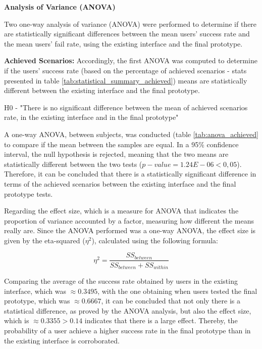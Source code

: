 \medskip

\textbf{Analysis of Variance (ANOVA)}

\medskip

Two one-way analysis of variance (ANOVA) were performed to determine if there are statistically significant differences between the mean users' success rate and the mean users' fail rate, using the existing interface and the final prototype.

\textbf{Achieved Scenarios:} Accordingly, the first ANOVA was computed to determine if the users' success rate (based on the percentage of achieved scenarios - stats presented in table \ref{tab:statistical_summary_achieved}) means are statistically different between the existing interface and the final prototype.

\begin{center}
  H0 - "There is no significant difference between the mean of achieved scenarios rate, in the existing interface and in the final prototype"
\end{center}

A one-way ANOVA, between subjects, was conducted (table \ref{tab:anova_achieved} to compare if the mean between the samples are equal. In a 95\% confidence interval, the null hypothesis is rejected, meaning that the two means are statistically different between the two tests ($p-value = 1.24E-06 < 0,05$). Therefore, it can be concluded that there is a statistically significant difference in terms of the achieved scenarios between the existing interface and the final prototype tests.

Regarding the effect size, which is a measure for ANOVA that indicates the proportion of variance accounted by a factor, measuring how different the means really are. Since the ANOVA performed was a one-way ANOVA, the effect size is given by the eta-squared ($\eta^2$), calculated using the following formula:

\[ \eta^2 = \frac{SS_{between}}{SS_{between} + SS_{within}} \]

Comparing the average of the success rate obtained by users in the existing interface, which was $\approx 0.3495$, with the one obtaining when users tested the final prototype, which was $\approx 0.6667$, it can be concluded that not only there is a statistical difference, as proved by the ANOVA analysis, but also the effect size, which is $\approx 0.3355 > 0.14$ indicates that there is a large effect. Thereby, the probability of a user achieve a higher success rate in the final prototype than in the existing interface is corroborated.

